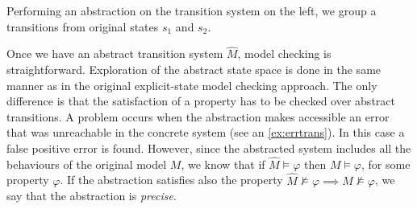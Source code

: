 \begin{example} \label{ex:errtrans}
Performing an abstraction on the transition system on the left, we group a transitions from
original states $s_1$ and $s_2$.
\begin{center}
\end{center}
\end{example}

Once we have an abstract transition system $\widehat{M}$, model checking is
straightforward. Exploration of the abstract state space is done in the same
manner as in the original explicit-state model checking approach. The only
difference is that the satisfaction of a property has to be checked over
abstract transitions. A problem occurs when the abstraction makes accessible an
error that was unreachable in the concrete system (see an
\autoref{ex:errtrans}).
In this case a false positive error is found. However, since the abstracted system
includes all the behaviours of the original model $M$, we know that if
$\widehat{M} \models \varphi$ then $M \models \varphi$, for some property
$\varphi$. If the abstraction satisfies also the property $\widehat{M}
\not\models \varphi \implies M \not\models \varphi$, we say that the abstraction
is \emph{precise}.
